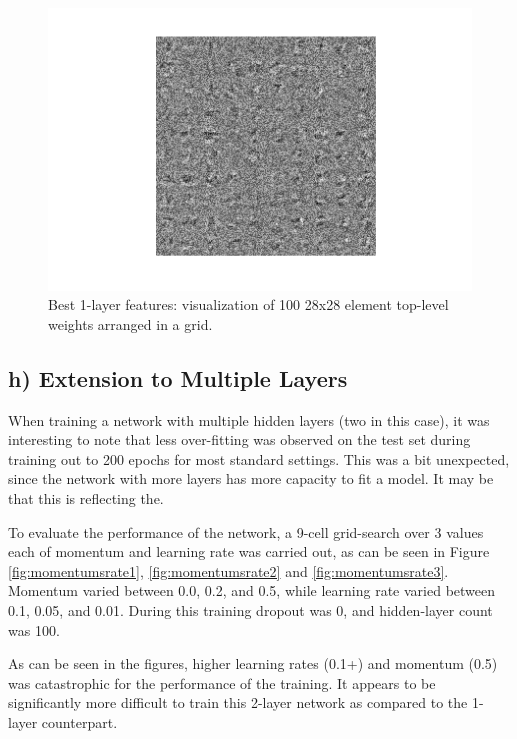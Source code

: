 \documentclass{article}
\begin{document}
\begin{figure}[h]
  \centering
  \includegraphics[scale=0.6]{../one_layer_best_features.png} 
  \caption{Best 1-layer features: visualization of 100 28x28 element top-level weights arranged in a grid. }
  \label{fig:onelayerbestfeatures}
\end{figure}



\subsection{h) Extension to Multiple Layers}

When training a network with multiple hidden layers (two in this case), it was interesting to note that less over-fitting was observed on the test set during training out to 200 epochs for most standard settings.  This was a bit unexpected, since the network with more layers has more capacity to fit a model.  It may be that this is reflecting the. 

To evaluate the performance of the network, a 9-cell grid-search over 3 values each of momentum and learning rate was carried out, as can be seen in Figure \ref{fig:momentumsrate1}, \ref{fig:momentumsrate2} and \ref{fig:momentumsrate3}. Momentum varied between 0.0, 0.2, and 0.5, while learning rate varied between 0.1, 0.05, and 0.01. During this training dropout was 0, and hidden-layer count was 100. 

As can be seen in the figures, higher learning rates (0.1+) and momentum (0.5) was catastrophic for the performance of the training.  It appears to be significantly more difficult to train this 2-layer network as compared to the 1-layer counterpart. 
\end{document}
